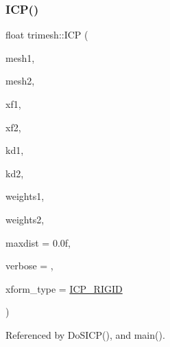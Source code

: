 \subsubsection{\texorpdfstring{I\+C\+P()}{ICP()}\hspace{0.1cm}{\footnotesize\ttfamily [1/7]}}
{\footnotesize\ttfamily float trimesh\+::\+I\+CP (\begin{DoxyParamCaption}\item[{\hyperlink{classtrimesh_1_1TriMesh}{Tri\+Mesh} $\ast$}]{mesh1,  }\item[{\hyperlink{classtrimesh_1_1TriMesh}{Tri\+Mesh} $\ast$}]{mesh2,  }\item[{const \hyperlink{namespacetrimesh_ad504958f2f56e393991b848986a8459f}{xform} \&}]{xf1,  }\item[{\hyperlink{namespacetrimesh_ad504958f2f56e393991b848986a8459f}{xform} \&}]{xf2,  }\item[{const \hyperlink{classtrimesh_1_1KDtree}{K\+Dtree} $\ast$}]{kd1,  }\item[{const \hyperlink{classtrimesh_1_1KDtree}{K\+Dtree} $\ast$}]{kd2,  }\item[{\+::std\+::vector$<$ float $>$ \&}]{weights1,  }\item[{\+::std\+::vector$<$ float $>$ \&}]{weights2,  }\item[{float}]{maxdist = {\ttfamily 0.0f},  }\item[{int}]{verbose = {},  }\item[{\hyperlink{namespacetrimesh_a64c747e4228158428e9cd911672cb1be}{I\+C\+P\+\_\+xform\+\_\+type}}]{xform\+\_\+type = {\ttfamily \hyperlink{namespacetrimesh_a64c747e4228158428e9cd911672cb1beab1d341808d3d7fb0bcff97fad1e83174}{I\+C\+P\+\_\+\+R\+I\+G\+ID}} }\end{DoxyParamCaption})}



Referenced by Do\+S\+I\+C\+P(), and main().

\mbox{\label{namespacetrimesh_a48c046b2eee6d9f2febe817f3491e0ae}} 
